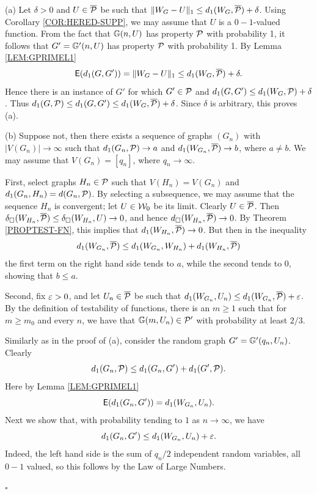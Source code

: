 \documentclass{article}
\newenvironment{proof}{\medskip\noindent{\bf Proof. }}{\hfill$\square$\medskip}
\begin{document}
\begin{proof}
(a) Let $\delta>0$ and $U\in\overline{\mathcal{P}}$ be such that
$\|W_G-U\|_1\le d_1(W_G,\overline{\mathcal{P}})+\delta$. Using Corollary
\ref{COR:HERED-SUPP}, we may assume that $U$ is a $0-1$-valued
function. From the fact that ${\mathbb G}(n,U)$ has property $\mathcal{P}$ with
probability 1, it follows that $G'={\mathbb G}'(n,U)$ has property $\mathcal{P}$ with
probability 1. By Lemma \ref{LEM:GPRIMEL1}
\[
{\sf E}(d_1(G,G'))= \|W_G-U\|_1\le d_1(W_G,\overline{\mathcal{P}})+\delta.
\]
Hence there is an instance of $G'$ for which $G'\in\mathcal{P}$ and
$d_1(G,G')\le d_1(W_G,\mathcal{P})+\delta$. Thus $d_1(G,\mathcal{P})\le d_1(G,G')\le
d_1(W_G,\overline{\mathcal{P}})+\delta$. Since $\delta$ is arbitrary, this
proves (a).

\smallskip

(b) Suppose not, then there exists a sequence of graphs $(G_n)$ with
$|V(G_n)|\to\infty$ such that $d_1(G_n,\mathcal{P})\to a$ and
$d_1(W_{G_n},\overline{\mathcal{P}})\to b$, where $a\not= b$. We may assume
that $V(G_n)=[q_n]$, where $q_n\to\infty$.

First, select graphs $H_n\in\mathcal{P}$ such that $V(H_n)=V(G_n)$ and
$d_1(G_n,H_n)=d(G_n,\mathcal{P})$. By selecting a subsequence, we may assume
that the sequence $H_n$ is convergent; let $U\in\mathcal{W}_0$ be its limit.
Clearly $U\in\overline{\mathcal{P}}$. Then
$\delta_\square(W_{H_n},\overline{\mathcal{P}})\le
\delta_\square(W_{H_n},U)\to 0$, and hence $d_\square(W_{H_n},\overline{\mathcal{P}})\to
0$. By Theorem \ref{PROPTEST-FN}, this implies that
$d_1(W_{H_n},\overline{\mathcal{P}})\to 0$. But then in the inequality
\[
d_1(W_{G_n},\overline{\mathcal{P}}) \le d_1(W_{G_n},W_{H_n})
+d_1(W_{H_n},\overline{\mathcal{P}})
\]
the first term on the right hand side tends to $a$, while the second
tends to $0$, showing that $b\le a$.

Second, fix $\varepsilon>0$, and let $U_n\in\overline{\mathcal{P}}$ be such that
$d_1(W_{G_n},U_n) \le d_1(W_{G_n},\overline{\mathcal{P}})+ \varepsilon$. By the
definition of testability of functions, there is an $m\ge 1$ such
that for $m\ge m_0$ and every $n$, we have that ${\mathbb G}(m,U_n)\in\mathcal{P}'$
with probability at least $2/3$.

Similarly as in the proof of (a), consider the random graph
$G'={\mathbb G}'(q_n,U_n)$. Clearly
\begin{equation}\label{GNGX}
d_1(G_n, \mathcal{P}) \le d_1(G_n,G')+d_1(G', \mathcal{P}).
\end{equation}
Here by Lemma \ref{LEM:GPRIMEL1}
\begin{equation}\label{EQ:EGNGX}
{\sf E}(d_1(G_n,G'))=d_1(W_{G_n},U_n).
\end{equation}
Next we show that, with probability tending to $1$ as $n\to\infty$,
we have
\begin{equation}\label{GNUN}
d_1(G_n,G')\le d_1(W_{G_n},U_n)+\varepsilon.
\end{equation}
Indeed, the left hand side is the sum of $q_n/2$ independent random
variables, all $0-1$ valued, so this follows by the Law of Large
Numbers.


\end{proof}
\end{document}
